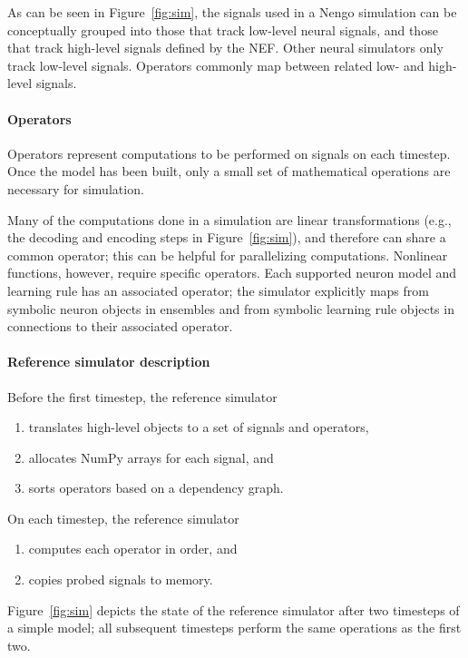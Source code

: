 \documentclass{frontiersSCNS}
\begin{document}
As can be seen in Figure~\ref{fig:sim},
the signals used in a Nengo simulation
can be conceptually grouped into
those that track low-level neural signals,
and those that track high-level signals
defined by the NEF.
Other neural simulators only track
low-level signals.
Operators commonly map
between related low- and high-level signals.

\paragraph{Operators}

Operators represent computations
to be performed on signals on each timestep.
Once the model has been built,
only a small set of mathematical
operations are necessary for simulation.

Many of the computations
done in a simulation
are linear transformations (e.g.,
the decoding and encoding steps
in Figure~\ref{fig:sim}),
and therefore can share a common operator;
this can be helpful for parallelizing computations.
Nonlinear functions, however,
require specific operators.
Each supported neuron model and learning rule
has an associated operator;
the simulator explicitly maps
from symbolic neuron objects in ensembles
and from symbolic learning rule objects
in connections to their associated operator.

\paragraph{Reference simulator description}

Before the first timestep, the reference simulator
\begin{enumerate}
  \item translates high-level objects to
    a set of signals and operators,
  \item allocates NumPy arrays for each signal, and
  \item sorts operators based on a dependency graph.
\end{enumerate}
On each timestep, the reference simulator
\begin{enumerate}
  \item computes each operator in order, and
  \item copies probed signals to memory.
\end{enumerate}
Figure~\ref{fig:sim} depicts
the state of the reference simulator
after two timesteps of a simple model;
all subsequent timesteps perform the same
operations as the first two.
\end{document}

